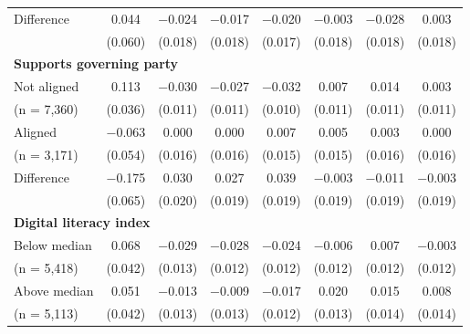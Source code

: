 \begin{tabular}[t]{lccccccc}
\hspace{1em} Difference & \num{0.044} & \num{-0.024} & \num{-0.017} & \num{-0.020} & \num{-0.003} & \num{-0.028} & \num{0.003}\\
\hspace{2em} & (\num{0.060}) & (\num{0.018}) & (\num{0.018}) & (\num{0.017}) & (\num{0.018}) & (\num{0.018}) & (\num{0.018})\\\multicolumn{4}{l}{\textbf{Supports governing party}} \rule{0pt}{1.2\normalbaselineskip}\\
\hspace{1em} Not aligned & \num{0.113} & \num{-0.030} & \num{-0.027} & \num{-0.032} & \num{0.007} & \num{0.014} & \num{0.003}\\
\hspace{2em}(n = 7,360) & (\num{0.036}) & (\num{0.011}) & (\num{0.011}) & (\num{0.010}) & (\num{0.011}) & (\num{0.011}) & (\num{0.011})\\
\hspace{1em} Aligned & \num{-0.063} & \num{0.000} & \num{0.000} & \num{0.007} & \num{0.005} & \num{0.003} & \num{0.000}\\
\hspace{2em}(n = 3,171) & (\num{0.054}) & (\num{0.016}) & (\num{0.016}) & (\num{0.015}) & (\num{0.015}) & (\num{0.016}) & (\num{0.016})\\\cmidrule(lr){2-8}
\hspace{1em} Difference & \num{-0.175} & \num{0.030} & \num{0.027} & \num{0.039} & \num{-0.003} & \num{-0.011} & \num{-0.003}\\
\hspace{2em} & (\num{0.065}) & (\num{0.020}) & (\num{0.019}) & (\num{0.019}) & (\num{0.019}) & (\num{0.019}) & (\num{0.019})\\\multicolumn{4}{l}{\textbf{Digital literacy index}} \rule{0pt}{1.2\normalbaselineskip}\\
\hspace{1em} Below median & \num{0.068} & \num{-0.029} & \num{-0.028} & \num{-0.024} & \num{-0.006} & \num{0.007} & \num{-0.003}\\
\hspace{2em}(n = 5,418) & (\num{0.042}) & (\num{0.013}) & (\num{0.012}) & (\num{0.012}) & (\num{0.012}) & (\num{0.012}) & (\num{0.012})\\
\hspace{1em} Above median & \num{0.051} & \num{-0.013} & \num{-0.009} & \num{-0.017} & \num{0.020} & \num{0.015} & \num{0.008}\\
\hspace{2em}(n = 5,113) & (\num{0.042}) & (\num{0.013}) & (\num{0.013}) & (\num{0.012}) & (\num{0.013}) & (\num{0.014}) & (\num{0.014})\\\cmidrule(lr){2-8}

\end{tabular}
